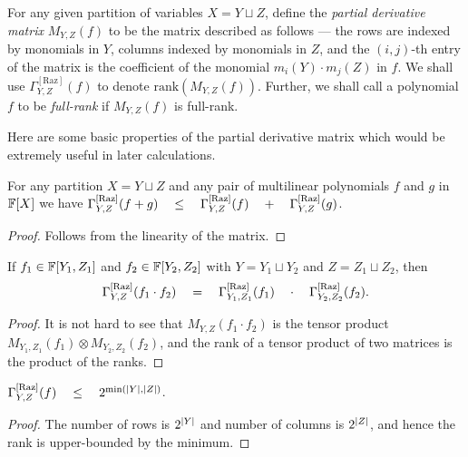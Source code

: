 \begin{definition}
For any given partition of variables $X = Y \sqcup Z$, define the \emph{partial derivative matrix} $M_{Y,Z}(f)$ to be the matrix described as follows --- the rows are indexed by monomials in $Y$, columns indexed by monomials in $Z$, and the $(i,j)$-th entry of the matrix is the coefficient of the monomial $m_i(Y)\cdot m_j(Z)$ in $f$. We shall use $\Gamma^{\mathrm{[Raz]}}_{Y,Z}(f)$ to denote $\mathrm{rank}(M_{Y,Z}(f))$. Further, we shall call a polynomial $f$ to be \emph{full-rank} if $M_{Y,Z}(f)$ is full-rank.
\end{definition}

Here are some basic properties of the partial derivative matrix which would be extremely useful in later calculations.

\begin{observation}\label{obs:pdm-subadditivity}
	For any partition $X = Y \sqcup Z$ and any pair of multilinear 
	polynomials $f$ and $g$ in $\mathbb{F}[X]$ we have 
$\Gamma^{\mathrm{[Raz]}}_{Y,Z}(f+g) \quad \leq \quad \Gamma^{\mathrm{[Raz]}}_{Y,Z}(f) \quad + \quad \Gamma^{\mathrm{[Raz]}}_{Y,Z}(g)$.
\end{observation}
\begin{proof}
Follows from the linearity of the matrix. 
\end{proof}

\begin{observation}[Multiplicativity]\label{obs:pdm-multiplicativity}
If $f_1 \in \mathbb{F}[Y_1,Z_1]$ and $f_2 \in \mathbb{F}[Y_2, Z_2]$ with $Y = Y_1 \sqcup Y_2$ and $Z = Z_1 \sqcup Z_2$, then
$$
\Gamma^{\mathrm{[Raz]}}_{Y,Z}(f_1\cdot f_2) \quad = \quad \Gamma^{\mathrm{[Raz]}}_{Y_1, Z_1}(f_1) \quad \cdot \quad \Gamma^{\mathrm{[Raz]}}_{Y_2, Z_2}(f_2).
$$
\end{observation}
\begin{proof}
  It is not hard to see that $M_{Y,Z}(f_1\cdot f_2)$ is the tensor product $M_{Y_1, Z_1}(f_1) \otimes M_{Y_2, Z_2}(f_2)$, and the rank of a tensor product of two matrices is the product of the ranks.
\end{proof}

\begin{observation}\label{obs:pdm-upperbound}
  $\Gamma^{\mathrm{[Raz]}}_{Y,Z}(f) \quad \leq \quad 2^{\min(\left|Y\right|, \left|Z\right|)}$.
\end{observation}
\begin{proof}
  The number of rows is $2^{\left|Y\right|}$ and number of columns is $2^{\left|Z\right|}$, and hence the rank is upper-bounded by the minimum.
\end{proof}


